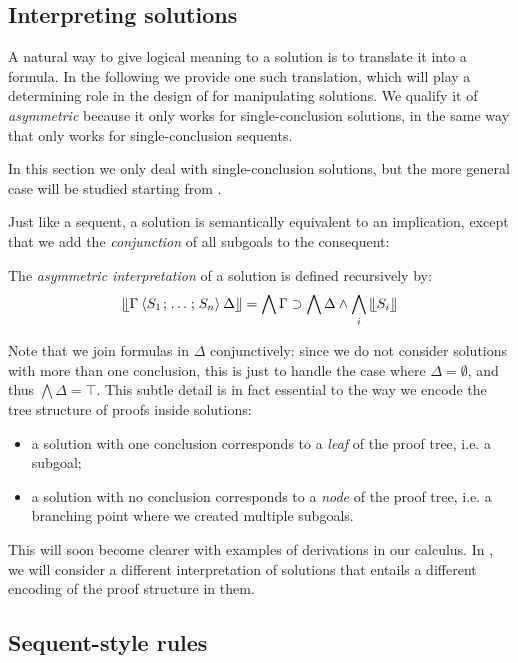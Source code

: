 \subsection{Interpreting solutions}

A natural way to give logical meaning to a solution is to translate it into a
formula. In the following we provide one such translation, which will play a
determining role in the design of  for manipulating solutions. We
qualify it of \emph{asymmetric} because it only works for single-conclusion
solutions, in the same way that  only works for single-conclusion
sequents.

\begin{remark}
In this section we only deal with single-conclusion solutions, but the more
general case will be studied starting from .
\end{remark}

Just like a sequent, a solution is semantically equivalent to an implication,
except that we add the \emph{conjunction} of all subgoals to the consequent:

\begin{definition}
The \emph{asymmetric interpretation} of a solution is defined recursively by:
$$\llfloor \Gamma \mathbin{\langle S_1 \;\!;\!\; \ldots \;\!;\!\; S_n \rangle} \Delta \rrfloor = \bigwedge \Gamma
  \supset \bigwedge \Delta \land \bigwedge_i{\llfloor S_i \rrfloor}$$
\end{definition}

Note that we join formulas in $\Delta$ conjunctively: since we do not consider
solutions with more than one conclusion, this is just to handle the case where
$\Delta = \emptyset$, and thus $\bigwedge \Delta = \top$. This subtle detail is
in fact essential to the way we encode the tree structure of proofs inside
solutions:
\begin{itemize}
\item a solution with one conclusion corresponds to a \emph{leaf} of the proof
tree, i.e. a subgoal;
\item a solution with no conclusion corresponds to a \emph{node} of the proof
tree, i.e. a branching point where we created multiple subgoals.
\end{itemize}
This will soon become clearer with examples of derivations in our calculus. In
, we will consider a different interpretation of solutions that
entails a different encoding of the proof structure in them.

\subsection{Sequent-style rules}

